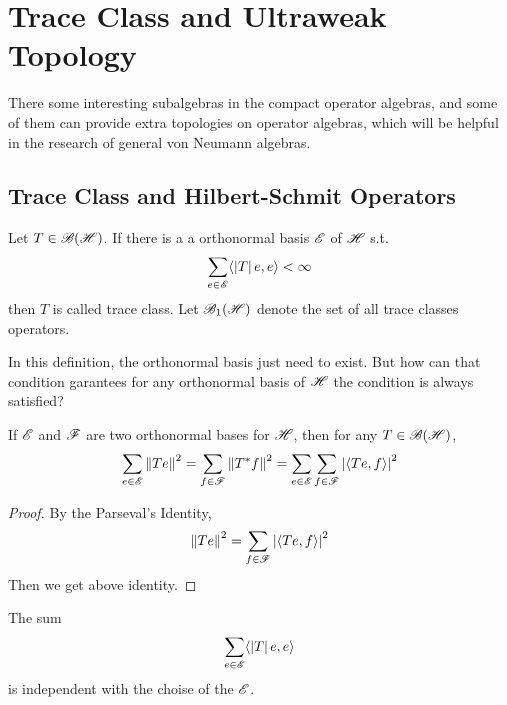 \section{Trace Class and Ultraweak Topology}

There some interesting subalgebras in the compact operator algebras, and some of them can provide extra topologies on operator algebras, which will be helpful in the research of general von Neumann algebras.

\subsection{Trace Class and Hilbert-Schmit Operators}

\begin{defn}
	Let $T \in \mathscr{B(H)}$. If there is a a orthonormal basis $\mathscr{E}$ of $\mathscr{H}$ s.t.
	\begin{equation*}
		\sum_{e \in \mathscr{E}} \langle \left\lvert T\right\lvert e,e \rangle < \infty
	\end{equation*}
	then $T$ is called trace class. Let $\mathscr{B}_{1}\mathscr{(H)}$ denote the set of all trace classes operators.
\end{defn}

In this definition, the orthonormal basis just need to exist. But how can that condition garantees for any orthonormal basis of $\mathscr{H}$ the condition is always satisfied?

\begin{prop}
	If $\mathscr{E}$ and $\mathscr{F}$ are two orthonormal bases for $\mathscr{H}$, then for any $T \in \mathscr{B(H)}$,
	\begin{equation*}
		\sum_{e \in \mathscr{E}} \left\lVert Te\right\lVert^2 = \sum_{f \in \mathscr{F}} \left\lVert T^{*}f\right\lVert^2 = \sum_{e \in \mathscr{E}}\sum_{f \in \mathscr{F}} \left\lvert\langle Te,f \rangle\right\lvert^2
	\end{equation*}
\end{prop}
\begin{proof}
	By the Parseval's Identity,
	\begin{equation*}
		\left\lVert Te\right\lVert^2 = \sum_{f \in \mathscr{F}} \left\lvert\langle Te,f \rangle\right\lvert^2
	\end{equation*}
	Then we get above identity.
\end{proof}

\begin{cor}
	The sum 
	\begin{equation*}
		\sum_{e \in \mathscr{E}} \langle \left\lvert T\right\lvert e,e \rangle
	\end{equation*}
	is independent with the choise of the $\mathscr{E}$.
\end{cor}

